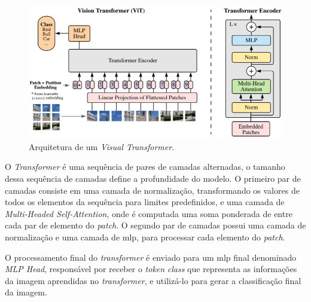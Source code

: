 \begin{figure}[htb]
\centerline{\includegraphics[width=1\linewidth]{images/visual transformer.png}}
\caption{Arquitetura de um \textit{Visual Transformer}\cite{vit}.}
\label{fig:vit_arch}
\end{figure}

O \textit{Transformer} é uma sequência de pares de camadas alternadas, o tamanho dessa sequência de camadas define a profundidade do modelo. 
O primeiro par de camadas consiste em uma camada de normalização, transformando os valores de todos os elementos da sequência para limites predefinidos, e uma camada de \textit{Multi-Headed Self-Attention}, onde é computada uma soma ponderada de entre cada par de elemento do \textit{patch}.
O segundo par de camadas possui uma camada de normalização e uma camada de \acrshort{mlp}, para processar cada elemento do \textit{patch}.

O processamento final do \textit{transformer} é enviado para um \acrshort{mlp} final denominado \textit{MLP Head}, responsável por receber o \textit{token} \textit{class} que representa as informações da imagem aprendidas no \textit{transformer}, e utilizá-lo para gerar a classificação final da imagem.